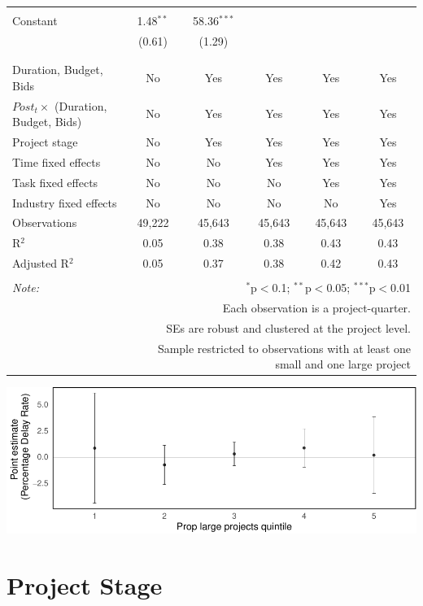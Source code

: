 \documentclass[
]{article}
\begin{document}
\begin{table}[H]
\begin{tabular}{@{\extracolsep{-2pt}}lccccc}
  & & & & & \\ 
 Constant & 1.48$^{**}$ & 58.36$^{***}$ &  &  &  \\ 
  & (0.61) & (1.29) &  &  &  \\ 
  & & & & & \\ 
\hline \\[-1.8ex] 
Duration, Budget, Bids & No & Yes & Yes & Yes & Yes \\ 
$Post_t \times $  (Duration, Budget, Bids) & No & Yes & Yes & Yes & Yes \\ 
Project stage & No & Yes & Yes & Yes & Yes \\ 
Time fixed effects & No & No & Yes & Yes & Yes \\ 
Task fixed effects & No & No & No & Yes & Yes \\ 
Industry fixed effects & No & No & No & No & Yes \\ 
Observations & 49,222 & 45,643 & 45,643 & 45,643 & 45,643 \\ 
R$^{2}$ & 0.05 & 0.38 & 0.38 & 0.43 & 0.43 \\ 
Adjusted R$^{2}$ & 0.05 & 0.37 & 0.38 & 0.42 & 0.43 \\ 
\hline 
\hline \\[-1.8ex] 
\textit{Note:}  & \multicolumn{5}{r}{$^{*}$p$<$0.1; $^{**}$p$<$0.05; $^{***}$p$<$0.01} \\ 
 & \multicolumn{5}{r}{Each observation is a project-quarter.} \\ 
 & \multicolumn{5}{r}{SEs are robust and clustered at the project level.} \\ 
 & \multicolumn{5}{r}{Sample restricted to observations with at least one small and one large project} \\ 
\end{tabular} 
\end{table}

\includegraphics{qp_first_pc_delay-2_files/figure-latex/project_portfolio_discrete_budget-1.pdf}

\hypertarget{project-stage}{%
\section{Project Stage}\label{project-stage}}
\end{document}
